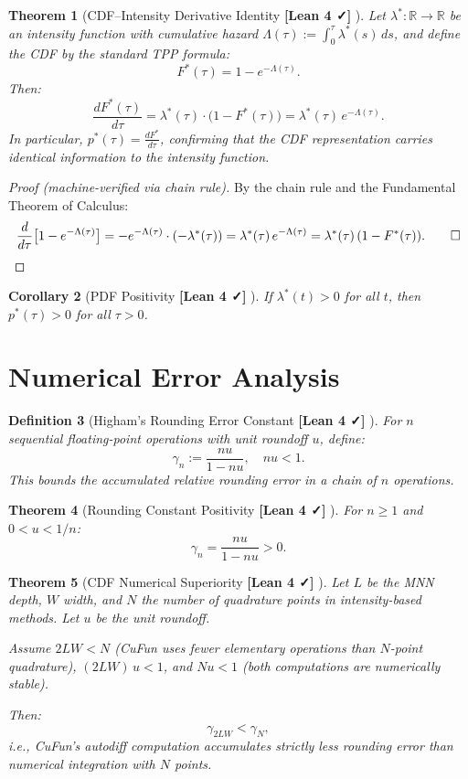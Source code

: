 \documentclass[11pt]{article}
\newtheorem{theorem}{Theorem}[section]
\newtheorem{corollary}[theorem]{Corollary}
\newtheorem{definition}[theorem]{Definition}
\newcommand{\verified}{%
  \textcolor{green!60!black}{\textbf{[Lean 4 ✓]}}%
}
\newcommand{\R}{\mathbb{R}}
\begin{document}
\begin{theorem}[CDF–Intensity Derivative Identity \verified{}]
\label{thm:cdf-intensity}
Let $\lambda^* : \R \to \R$ be an intensity function with cumulative hazard
$\Lambda(\tau) := \int_0^\tau \lambda^*(s)\,ds$,
and define the CDF by the standard TPP formula:
\[
  F^*(\tau) = 1 - e^{-\Lambda(\tau)}.
\]
Then:
\[
  \frac{dF^*(\tau)}{d\tau}
  = \lambda^*(\tau) \cdot \bigl(1 - F^*(\tau)\bigr)
  = \lambda^*(\tau)\, e^{-\Lambda(\tau)}.
\]
In particular, $p^*(\tau) = \frac{dF^*}{d\tau}$, confirming that the CDF
representation carries \emph{identical information} to the intensity function.
\end{theorem}

\begin{proof}[Proof (machine-verified via chain rule)]
By the chain rule and the Fundamental Theorem of Calculus:
\[
  \frac{d}{d\tau}\bigl[1 - e^{-\Lambda(\tau)}\bigr]
  = -e^{-\Lambda(\tau)} \cdot (-\lambda^*(\tau))
  = \lambda^*(\tau)\, e^{-\Lambda(\tau)}
  = \lambda^*(\tau)\,(1 - F^*(\tau)). \qed
\]
\end{proof}

\begin{corollary}[PDF Positivity \verified{}]
\label{cor:pdf-pos}
If $\lambda^*(t) > 0$ for all $t$, then $p^*(\tau) > 0$ for all $\tau > 0$.
\end{corollary}

\section{Numerical Error Analysis}

\begin{definition}[Higham's Rounding Error Constant \verified{}]
For $n$ sequential floating-point operations with unit roundoff $u$, define:
\[
  \gamma_n := \frac{n u}{1 - n u}, \quad n u < 1.
\]
This bounds the accumulated relative rounding error in a chain of $n$ operations.
\end{definition}

\begin{theorem}[Rounding Constant Positivity \verified{}]
For $n \geq 1$ and $0 < u < 1/n$:
\[
  \gamma_n = \frac{nu}{1-nu} > 0.
\]
\end{theorem}

\begin{theorem}[CDF Numerical Superiority \verified{}]
\label{thm:numerical}
Let $L$ be the MNN depth, $W$ width, and $N$ the number of quadrature points
in intensity-based methods. Let $u$ be the unit roundoff.

Assume $2LW < N$ (CuFun uses fewer elementary operations than $N$-point quadrature),
$(2LW)\,u < 1$, and $N u < 1$ (both computations are numerically stable).

Then:
\[
  \gamma_{2LW} < \gamma_N,
\]
i.e., \emph{CuFun's autodiff computation accumulates strictly less rounding error
than numerical integration with $N$ points}.
\end{theorem}
\end{document}
